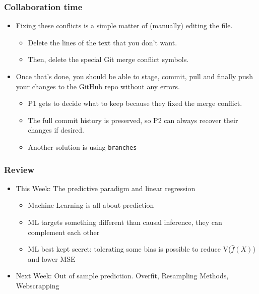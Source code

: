 \documentclass[
  shownotes,
  xcolor={svgnames},
  hyperref={colorlinks,citecolor=DarkBlue,linkcolor=andesred,urlcolor=DarkBlue}
  , aspectratio=169]{beamer}
\begin{document}
\begin{frame}[fragile]
\frametitle{Collaboration time}
\begin{itemize}
  \item Fixing these conflicts is a simple matter of (manually) editing the  file.
  \begin{itemize}
    \item  Delete the lines of the text that you don't want.
    \item  Then, delete the special Git merge conflict symbols.  
  \end{itemize}
  \bigskip
  \item Once that's done, you should be able to stage, commit, pull and finally push your changes to the GitHub repo without any errors.
  \begin{itemize}
    \item P1 gets to decide what to keep because they fixed the merge conflict.
    \item The full commit history is preserved, so P2 can always recover their changes if desired.
    \item Another solution is using \texttt{branches}
  \end{itemize}
\end{itemize}

\end{frame}
\begin{frame}[fragile]
\frametitle{Review}
  

\begin{itemize}
 \item This Week: The predictive paradigm and linear regression
 \medskip
    \begin{itemize} 
        \item Machine Learning is all about prediction
         \medskip
         \item ML targets something different than causal inference, they can complement each other
         \medskip
         \item ML best kept secret: tolerating some bias is possible to reduce V($\hat f(X)$) and lower MSE
         \medskip
      \end{itemize}
  \item Next Week: Out of sample prediction. Overfit, Resampling Methods, Webscrapping 

    \end{itemize}

\end{frame}



\end{document}
